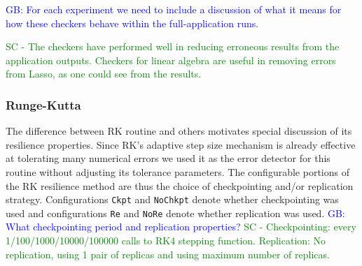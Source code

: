 \documentclass{sig-alternate}
\newcommand{\sui}[1]{%
  \textcolor{green}{SC - #1}
}
\newcommand{\greg}[1]{%
  \textcolor{blue}{GB: #1}
}
\begin{document}

\greg{For each experiment we need to include a discussion of what it means for how these checkers behave within the full-application runs.}

\sui{The checkers have performed well in reducing erroneous results from the application outputs. Checkers for linear algebra are useful in removing errors from Lasso, as one could see from the results.}




\subsubsection{Runge-Kutta}
\label{sec:res_tech:eval:rk}

The difference between RK routine and others motivates special discussion of its resilience properties.
Since RK's adaptive step size mechanism is already effective at tolerating many numerical errors we used it as the error detector for this routine without adjusting its tolerance parameters.
The configurable portions of the RK resilience method are thus the choice of checkpointing and/or replication strategy.
Configurations \texttt{Ckpt} and \texttt{NoChkpt} denote whether checkpointing was used and configurations \texttt{Re} and \texttt{NoRe} denote whether replication was used.
\greg{What checkpointing period and replication properties?} \sui{Checkpointing: every 1/100/1000/10000/100000 calls to RK4 stepping function. Replication: No replication, using 1 pair of replicas and using maximum number of replicas.}
\end{document}
